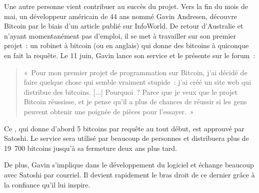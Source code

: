 
Une autre personne vient contribuer au succès du projet. Vers la fin du mois de mai, un développeur américain de 44 ans nommé Gavin Andresen, découvre Bitcoin par le biais d'un article publié sur InfoWorld. De retour d'Australie et n'ayant momentanément pas d'emploi, il se met à travailler sur son premier projet~: un robinet à bitcoin (ou  en anglais) qui donne des bitcoins à quiconque en fait la requête. Le 11 juin, Gavin lance son service et le présente sur le forum~:

\begin{quote}
«~Pour mon premier projet de programmation sur Bitcoin, j'ai décidé de faire quelque chose qui semble vraiment stupide~: j'ai créé un site web qui distribue des bitcoins. [...] Pourquoi~? Parce que je veux que le projet Bitcoin réussisse, et je pense qu'il a plus de chances de réussir si les gens peuvent obtenir une poignée de pièces pour l'essayer.~»
\end{quote}

Ce , qui donne d'abord 5 bitcoins par requête au tout début, est approuvé par Satoshi. Le service sera utilisé par beaucoup de personnes et distribuera plus de 19~700 bitcoins jusqu'à sa fermeture deux ans plus tard.

De plus, Gavin s'implique dans le développement du logiciel et échange beaucoup avec Satoshi par courriel. Il devient rapidement le bras droit de ce dernier grâce à la confiance qu'il lui inspire.

